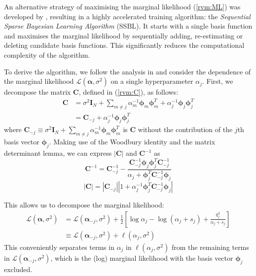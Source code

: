 An alternative strategy of maximising the marginal likelihood (\ref{rvm:ML}) was developed by \cite{tipping2003}, resulting in a highly accelerated training algorithm: the \emph{Sequential Sparse Bayesian Learning Algorithm} (SSBL).
It starts with a single basis function and maximises the marginal likelihood by sequentially adding, re-estimating or deleting candidate basis functions.
This significantly reduces the computational complexity of the algorithm.

To derive the algorithm, we follow the analysis in \cite{tipping2002} and consider the dependence of the marginal likelihood $\mathcal{L}(\bm\alpha,\sigma^2)$ on a single hyperparameter $\alpha_j$.
First, we decompose the matrix $\bm C$, defined in (\ref{rvm:C}), as follows:
\begin{equation*}
  \begin{split}
    \bm C &= \sigma^2 \bm I_N + \sum_{m \neq j} \alpha_m^{-1}\bm\phi_m\bm\phi_m^T + \alpha_j^{-1}\bm\phi_j\bm\phi_j^T \\
    &= \bm C_{-j} + \alpha_j^{-1}\bm\phi_j\bm\phi_j^T
  \end{split}
\end{equation*}
where $\bm C_{-j} \equiv \sigma^2 \bm I_N + \sum_{m \neq j} \alpha_m^{-1}\bm\phi_m\bm\phi_m^T$ is $\bm C$ without the contribution of the $j$th basis vector $\bm\phi_j$.
Making use of the Woodbury identity and the matrix determinant lemma, we can express $|\bm C|$ and $\bm C^{-1}$ as
\begin{equation*}
  \bm C^{-1} = \bm C_{-j}^{-1} - \frac{\bm C_{-j}^{-1}\bm\phi_j\bm\phi_j^T\bm C_{-j}^{-1}}{\alpha_j + \bm\phi_j^T\bm C_{-j}^{-1}\bm\phi_j}
\end{equation*}
\begin{equation*}
  \left|\bm C\right| = \left|\bm C_{-j}\right|\left|1 + \alpha^{-1}_j\bm\phi_j^T\bm C_{-j}^{-1}\bm\phi_j\right|
\end{equation*}

This allows us to decompose the marginal likelihood:
\begin{equation}
  \label{rvm:fastML}
  \begin{split}
    \mathcal{L}(\bm\alpha,\sigma^2) &= \mathcal{L}(\bm\alpha_{-j},\sigma^2) + \frac{1}{2}\left[\log\alpha_j
      - \log(\alpha_j + s_j) + \frac{q_j^2}{\alpha_j + s_j}\right]\\
    &\equiv \mathcal{L}(\bm\alpha_{-j},\sigma^2) + \ell(\alpha_j,\sigma^2)
  \end{split}
\end{equation}
This conveniently separates terms in $\alpha_j$ in $\ell(\alpha_j,\sigma^2)$ from the remaining terms in $\mathcal{L}(\bm\alpha_{-j},\sigma^2)$, which is the (log) marginal likelihood with the basis vector $\bm\phi_j$ excluded.

